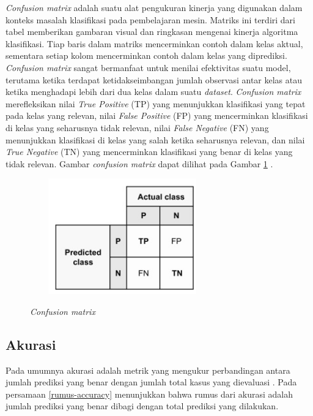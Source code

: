 \par \textit{Confusion matrix} adalah suatu alat pengukuran kinerja yang digunakan dalam konteks masalah klasifikasi pada pembelajaran mesin. Matriks ini terdiri dari tabel memberikan gambaran visual dan ringkasan mengenai kinerja algoritma klasifikasi. Tiap baris dalam matriks mencerminkan contoh dalam kelas aktual, sementara setiap kolom mencerminkan contoh dalam kelas yang diprediksi. \textit{Confusion matrix} sangat bermanfaat untuk menilai efektivitas suatu model, terutama ketika terdapat ketidakseimbangan jumlah observasi antar kelas atau ketika menghadapi lebih dari dua kelas dalam suatu \textit{dataset}. \textit{Confusion matrix} merefleksikan nilai \textit{True Positive} (TP) yang menunjukkan klasifikasi yang tepat pada kelas yang relevan, nilai \textit{False Positive} (FP) yang mencerminkan klasifikasi di kelas yang seharusnya tidak relevan, nilai \textit{False Negative} (FN) yang menunjukkan klasifikasi di kelas yang salah ketika seharusnya relevan, dan nilai \textit{True Negative} (TN) yang mencerminkan klasifikasi yang benar di kelas yang tidak relevan. Gambar \textit{confusion matrix} dapat dilihat pada Gambar \ref{Confusion Matrix} \citep{KULKARNI202083}.

\begin{figure}[H]
    \centering
    {\includegraphics [width = 8cm, height= 5cm]{image/bab2/conf-matrix.png}}
    \caption{\textit{Confusion matrix} \citep{KULKARNI202083}}
    \label{Confusion Matrix}
\end{figure}

\subsection{Akurasi}

\par Pada umumnya akurasi adalah metrik yang mengukur perbandingan antara jumlah prediksi yang benar dengan jumlah total kasus yang dievaluasi \citep{hossin2015review}. Pada persamaan \ref{rumus-accuracy} menunjukkan bahwa rumus dari akurasi adalah jumlah prediksi yang benar dibagi dengan total prediksi yang dilakukan.

